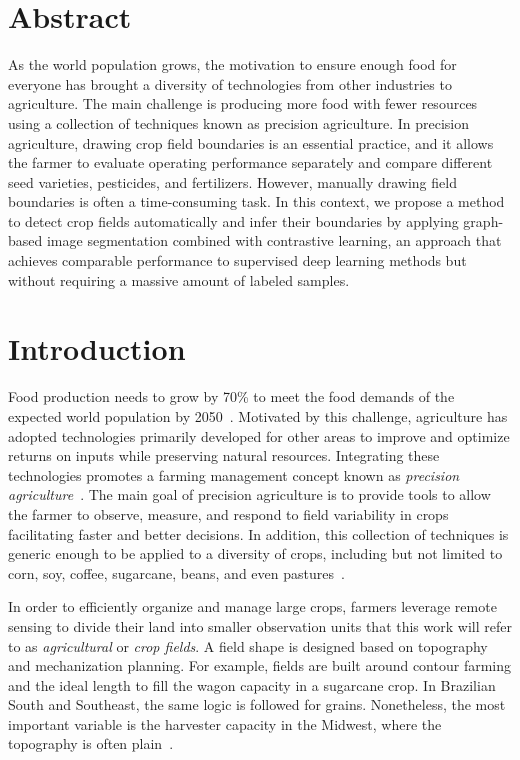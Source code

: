 \documentclass[12pt]{article}
\begin{document}
	\newpage
	\baselineskip
	\setcounter{page}{1}

\section*{Abstract}

As the world population grows, the motivation to ensure enough food for everyone has brought a diversity of technologies from other industries to agriculture. The main challenge is producing more food with fewer resources using a collection of techniques known as precision agriculture. In precision agriculture, drawing crop field boundaries is an essential practice, and it allows the farmer to evaluate operating performance separately and compare different seed varieties, pesticides, and fertilizers. However, manually drawing field boundaries is often a time-consuming task. In this context, we propose a method to detect crop fields automatically and infer their boundaries by applying graph-based image segmentation combined with contrastive learning, an approach that achieves comparable performance to supervised deep learning methods but without requiring a massive amount of labeled samples.

\section{Introduction}\label{section:introduction}

Food production needs to grow by 70\% to meet the food demands of the expected world population by 2050~\cite{nelson2010}. Motivated by this challenge, agriculture has adopted technologies primarily developed for other areas to improve and optimize returns on inputs while preserving natural resources. Integrating these technologies promotes a farming management concept known as \textit{precision agriculture}~\cite{zhang2002}. The main goal of precision agriculture is to provide tools to allow the farmer to observe, measure, and respond to field variability in crops facilitating faster and better decisions. In addition, this collection of techniques is generic enough to be applied to a diversity of crops, including but not limited to corn, soy, coffee, sugarcane, beans, and even pastures~\cite{mulla2013,bhakta2019}.

In order to efficiently organize and manage large crops, farmers leverage remote sensing to divide their land into smaller observation units that this work will refer to as \textit{agricultural} or \textit{crop fields}. A field shape is designed based on topography and mechanization planning. For example, fields are built around contour farming and the ideal length to fill the wagon capacity in a sugarcane crop. In Brazilian South and Southeast, the same logic is followed for grains. Nonetheless, the most important variable is the harvester capacity in the Midwest, where the topography is often plain~\cite{spekken2015,griffel2019,bolfe2020}.
\end{document}

